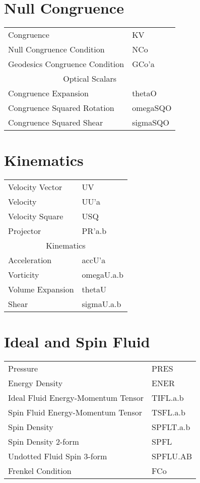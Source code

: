 \documentclass[twoside,openright]{report}
\newcommand{\grgtt}{\ttfamily}
\renewcommand{\tt}{\grgtt}
\begin{document}
\begin{center}
\section{Null Congruence}
\begin{tabular}{|l|l|}\hline
\tt    Congruence                    &\tt  KV\\
\tt    Null Congruence Condition     &\tt  NCo\\
\tt    Geodesics Congruence Condition&\tt  GCo'a\\
\hline
\multicolumn{2}{|c|}{\tt    Optical Scalars}\\
\tt    Congruence Expansion          &\tt  thetaO\\
\tt    Congruence Squared Rotation   &\tt  omegaSQO\\
\tt    Congruence Squared Shear      &\tt  sigmaSQO\\
\hline\end{tabular}

\section{Kinematics}
\begin{tabular}{|l|l|}\hline
\tt    Velocity Vector  &\tt   UV\\
\tt    Velocity         &\tt   UU'a\\
\tt    Velocity Square  &\tt   USQ\\
\tt    Projector        &\tt   PR'a.b\\
\hline
\multicolumn{2}{|c|}{\tt    Kinematics}\\
\tt    Acceleration     &\tt   accU'a\\
\tt    Vorticity        &\tt   omegaU.a.b\\
\tt    Volume Expansion &\tt   thetaU\\
\tt    Shear            &\tt   sigmaU.a.b\\
\hline\end{tabular}

\section{Ideal and Spin Fluid}
\begin{tabular}{|l|l|}\hline
\tt    Pressure                           &\tt  PRES\\
\tt    Energy Density                     &\tt  ENER\\
\tt    Ideal Fluid Energy-Momentum Tensor &\tt  TIFL.a.b\\
\hline
\tt    Spin Fluid Energy-Momentum Tensor &\tt  TSFL.a.b \\
\tt    Spin Density                      &\tt  SPFLT.a.b \\
\tt    Spin Density 2-form               &\tt  SPFL \\
\tt    Undotted Fluid Spin 3-form        &\tt  SPFLU.AB \\
\tt    Frenkel Condition                 &\tt  FCo \\
\hline\end{tabular}


\end{center}
\end{document}
